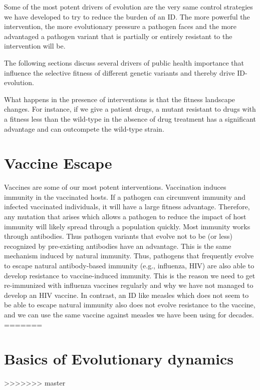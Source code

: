 \documentclass[]{book}
\theoremstyle{definition}
\theoremstyle{definition}
\theoremstyle{definition}
\theoremstyle{remark}
\begin{document}
Some of the most potent drivers of evolution are the very same control
strategies we have developed to try to reduce the burden of an ID. The
more powerful the intervention, the more evolutionary pressure a
pathogen faces and the more advantaged a pathogen variant that is
partially or entirely resistant to the intervention will be.

The following sections discuss several drivers of public health
importance that influence the selective fitness of different genetic
variants and thereby drive ID-evolution.

What happens in the presence of interventions is that the fitness
landscape changes. For instance, if we give a patient drugs, a mutant
resistant to drugs with a fitness less than the wild-type in the absence
of drug treatment has a significant advantage and can outcompete the
wild-type strain.

\hypertarget{vaccine-escape}{%
\section{Vaccine Escape}\label{vaccine-escape}}

Vaccines are some of our most potent interventions. Vaccination induces
immunity in the vaccinated hosts. If a pathogen can circumvent immunity
and infected vaccinated individuals, it will have a large fitness
advantage. Therefore, any mutation that arises which allows a pathogen
to reduce the impact of host immunity will likely spread through a
population quickly. Most immunity works through antibodies. Thus
pathogen variants that evolve not to be (or less) recognized by
pre-existing antibodies have an advantage. This is the same mechanism
induced by natural immunity. Thus, pathogens that frequently evolve to
escape natural antibody-based immunity (e.g., influenza, HIV) are also
able to develop resistance to vaccine-induced immunity. This is the
reason we need to get re-immunized with influenza vaccines regularly and
why we have not managed to develop an HIV vaccine. In contrast, an ID
like measles which does not seem to be able to escape natural immunity
also does not evolve resistance to the vaccine, and we can use the same
vaccine against measles we have been using for decades.
=======
\section{Basics of Evolutionary
dynamics}\label{basics-of-evolutionary-dynamics}
>>>>>>> master
\end{document}
